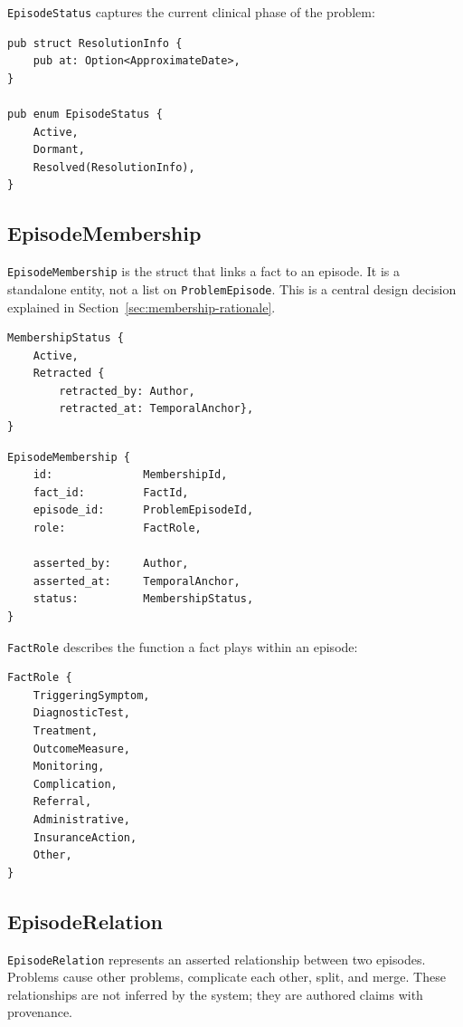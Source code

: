 \documentclass[11pt]{article}
\begin{document}
\texttt{EpisodeStatus} captures the current clinical phase of the problem:

\begin{lstlisting}
pub struct ResolutionInfo {
    pub at: Option<ApproximateDate>,
}

pub enum EpisodeStatus {
    Active,
    Dormant,
    Resolved(ResolutionInfo),
}
\end{lstlisting}

\subsection{EpisodeMembership}

\texttt{EpisodeMembership} is the struct that links a fact to an episode. It
is a standalone entity, not a list on \texttt{ProblemEpisode}. This is a
central design decision explained in Section~\ref{sec:membership-rationale}.

\begin{lstlisting}
MembershipStatus {
    Active,
    Retracted {
        retracted_by: Author,
        retracted_at: TemporalAnchor},
}
\end{lstlisting}

\begin{lstlisting}
EpisodeMembership {
    id:              MembershipId,
    fact_id:         FactId,
    episode_id:      ProblemEpisodeId,
    role:            FactRole,

    asserted_by:     Author,
    asserted_at:     TemporalAnchor,
    status:          MembershipStatus,
}
\end{lstlisting}

\texttt{FactRole} describes the function a fact plays within an episode:

\begin{lstlisting}
FactRole {
    TriggeringSymptom,
    DiagnosticTest,
    Treatment,
    OutcomeMeasure,
    Monitoring,
    Complication,
    Referral,
    Administrative,
    InsuranceAction,
    Other,
}
\end{lstlisting}



\subsection{EpisodeRelation}

\texttt{EpisodeRelation} represents an asserted relationship between two
episodes. Problems cause other problems, complicate each other, split,
and merge. These relationships are not inferred by the system; they are
authored claims with provenance.
\end{document}
